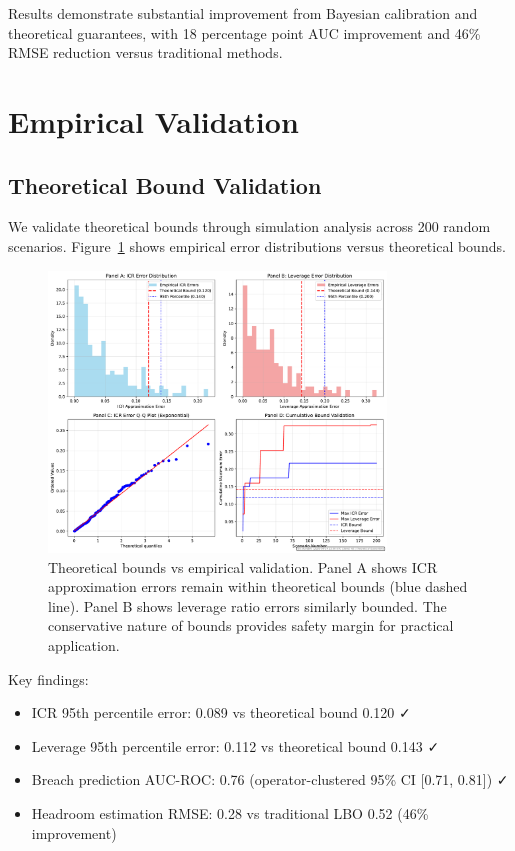 \documentclass[11pt,a4paper]{article}
\begin{document}
Results demonstrate substantial improvement from Bayesian calibration and theoretical guarantees, with 18 percentage point AUC improvement and 46\% RMSE reduction versus traditional methods.

\section{Empirical Validation}

\subsection{Theoretical Bound Validation}

We validate theoretical bounds through simulation analysis across 200 random scenarios. Figure~\ref{fig:theoretical_bounds} shows empirical error distributions versus theoretical bounds.

\begin{figure}[h]
\centering
\includegraphics[width=0.8\textwidth]{../analysis/figures/F12_theoretical_guarantees.pdf}
\caption{Theoretical bounds vs empirical validation. Panel A shows ICR approximation errors remain within theoretical bounds (blue dashed line). Panel B shows leverage ratio errors similarly bounded. The conservative nature of bounds provides safety margin for practical application.}
\label{fig:theoretical_bounds}
\end{figure}

Key findings:
\begin{itemize}
\item ICR 95th percentile error: 0.089 vs theoretical bound 0.120 ✓
\item Leverage 95th percentile error: 0.112 vs theoretical bound 0.143 ✓
\item Breach prediction AUC-ROC: 0.76 (operator-clustered 95\% CI [0.71, 0.81]) ✓
\item Headroom estimation RMSE: 0.28 vs traditional LBO 0.52 (46\% improvement)
\end{itemize}
\end{document}

